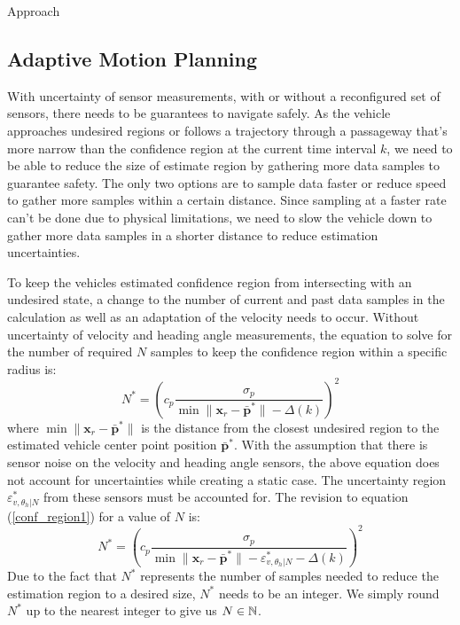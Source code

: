 \begin{section}{Approach}
\subsection{Adaptive Motion Planning}



With uncertainty of sensor measurements, with or without a reconfigured set of sensors, there needs to be guarantees to navigate safely. As the vehicle approaches undesired regions or follows a trajectory through a passageway that's more narrow than the confidence region at the current time interval $k$, we need to be able to reduce the size of estimate region by gathering more data samples to guarantee safety. The only two options are to sample data faster or reduce speed to gather more samples within a certain distance. Since sampling at a faster rate can't be done due to physical limitations, we need to slow the vehicle down to gather more data samples in a shorter distance to reduce estimation uncertainties.

To keep the vehicles estimated confidence region from intersecting with an undesired state, a change to the number of current and past data samples in the calculation as well as an adaptation of the velocity needs to occur. Without uncertainty of velocity and heading angle measurements, the equation to solve for the number of required $N$ samples to keep the confidence region within a specific radius is:
    \begin{equation}
    \label{conf_region1}
	    N^* = \left(c_p \frac{ \sigma_p }{ {\min \lVert \bm{x}_r - \bar{\bm{p}}^* \rVert} -\Delta(k) } \right)^2
	\end{equation}
where $ \min \lVert {\bm{x}_r-\bar{\bm{p}}^*} \rVert$ is the distance from the closest undesired region to the estimated vehicle center point position $\bar{\bm{p}}^*$.
With the assumption that there is sensor noise on the velocity and heading angle sensors, the above equation does not account for uncertainties while creating a static case. The uncertainty region $\varepsilon_{v,\theta_h|N}^{*}$ from these sensors must be accounted for. The revision to equation (\ref{conf_region1}) for a value of $N$ is:
    \begin{equation}
	    N^* = \left(c_p \frac{ \sigma_p }{ {\min \lVert \bm{x}_r - \bar{\bm{p}}^* \rVert} -\varepsilon_{v,\theta_h|N}^{*}-\Delta(k) } \right)^2
	\end{equation}
Due to the fact that $N^*$ represents the number of samples needed to reduce the estimation region to a desired size, $N^*$ needs to be an integer. We simply round $N^*$ up to the nearest integer to give us $N \in \mathbb{N}$.


\end{section}
